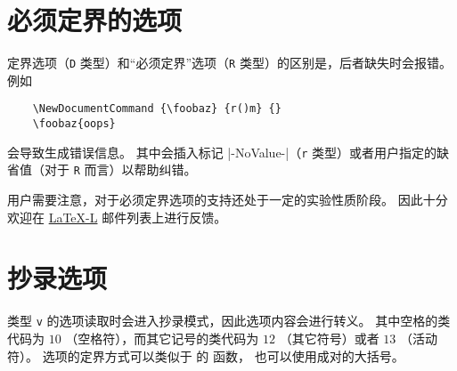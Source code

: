 \documentclass{l3doc}
\begin{document}
\section{必须定界的选项}

%
定界选项（\texttt{D} 类型）和“必须定界”选项（\texttt{R} 类型）的区别是，后者缺失时会报错。
例如
\begin{verbatim}
    \NewDocumentCommand {\foobaz} {r()m} {}
    \foobaz{oops}
\end{verbatim}
会导致生成错误信息。
其中会插入标记 |-NoValue-|（\texttt{r} 类型）或者用户指定的缺省值（对于 \texttt{R} 而言）以帮助纠错。

%
用户需要注意，对于必须定界选项的支持还处于一定的实验性质阶段。
因此十分欢迎在 \href{http://news.gmane.org/group/gmane.comp.tex.latex.latex3}{LaTeX-L} 邮件列表上进行反馈。

%
\section{抄录选项}

%
类型 \texttt{v} 的选项读取时会进入抄录模式，因此选项内容会进行转义。
其中空格的类代码为 $10$ （空格符），而其它记号的类代码为 $12$ （其它符号）或者 $13$ （活动符）。
选项的定界方式可以类似于 \LaTeXe{} 的  函数，
也可以使用成对的大括号。
\end{document}
